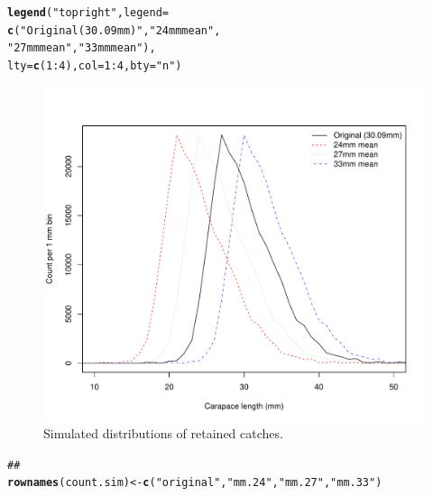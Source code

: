 \documentclass[12pt]{article}\usepackage[]{graphicx}\usepackage[]{color}
\makeatletter
\def\maxwidth{ %
  \ifdim\Gin@nat@width>\linewidth
    \linewidth
  \else
    \Gin@nat@width
  \fi
}
\newcommand{\hlnum}[1]{\textcolor[rgb]{0.686,0.059,0.569}{#1}}%
\newcommand{\hlstr}[1]{\textcolor[rgb]{0.192,0.494,0.8}{#1}}%
\newcommand{\hlcom}[1]{\textcolor[rgb]{0.678,0.584,0.686}{\textit{#1}}}%
\newcommand{\hlopt}[1]{\textcolor[rgb]{0,0,0}{#1}}%
\newcommand{\hlstd}[1]{\textcolor[rgb]{0.345,0.345,0.345}{#1}}%
\newcommand{\hlkwb}[1]{\textcolor[rgb]{0.69,0.353,0.396}{#1}}%
\newcommand{\hlkwc}[1]{\textcolor[rgb]{0.333,0.667,0.333}{#1}}%
\newcommand{\hlkwd}[1]{\textcolor[rgb]{0.737,0.353,0.396}{\textbf{#1}}}%
\newenvironment{kframe}{%
 \def\at@end@of@kframe{}%
 \ifinner\ifhmode%
  \def\at@end@of@kframe{\end{minipage}}%
  \begin{minipage}{\columnwidth}%
 \fi\fi%
 \def\FrameCommand##1{\hskip\@totalleftmargin \hskip-\fboxsep
 \colorbox{shadecolor}{##1}\hskip-\fboxsep
     \hskip-\linewidth \hskip-\@totalleftmargin \hskip\columnwidth}%
 \MakeFramed {\advance\hsize-\width
   \@totalleftmargin\z@ \linewidth\hsize
   \@setminipage}}%
 {\par\unskip\endMakeFramed%
 \at@end@of@kframe}
\newenvironment{knitrout}{}{} %
\makeatother
\begin{document}
\begin{knitrout}
\begin{kframe}
\begin{alltt}
\hlkwd{legend}\hlstd{(}\hlstr{"topright"}\hlstd{,} \hlkwc{legend} \hlstd{=}
       \hlkwd{c}\hlstd{(}\hlstr{"Original (30.09mm)"}\hlstd{,} \hlstr{"24mm mean"}\hlstd{,}
         \hlstr{"27mm mean"}\hlstd{,} \hlstr{"33mm mean"}\hlstd{),}
       \hlkwc{lty} \hlstd{=} \hlkwd{c}\hlstd{(}\hlnum{1}\hlopt{:}\hlnum{4}\hlstd{),} \hlkwc{col} \hlstd{=} \hlnum{1}\hlopt{:}\hlnum{4}\hlstd{,} \hlkwc{bty} \hlstd{=} \hlstr{"n"}\hlstd{)}
\end{alltt}
\end{kframe}\begin{figure}
\includegraphics[width=\maxwidth]{figure/simdist-1} \caption[Simulated distributions of retained catches]{Simulated distributions of retained catches.}\label{fig:simdist}
\end{figure}

\begin{kframe}\begin{alltt}
\hlcom{## }
\hlkwd{rownames}\hlstd{(count.sim)} \hlkwb{<-} \hlkwd{c}\hlstd{(}\hlstr{"original"}\hlstd{,} \hlstr{"mm.24"}\hlstd{,} \hlstr{"mm.27"}\hlstd{,} \hlstr{"mm.33"}\hlstd{)}
\end{alltt}
\end{kframe}
\end{knitrout}
\end{document}
